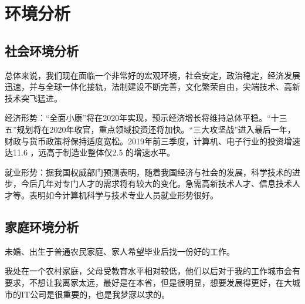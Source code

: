\documentclass{article}
\begin{document}
\section{环境分析}
\par
\subsection{社会环境分析}
\par
总体来说，我们现在面临一个非常好的宏观环境，社会安定，政治稳定，经济发展迅速，并与全球一体化接轨，法制建设不断完善，文化繁荣自由，尖端技术、高新技术突飞猛进。\par
经济形势：“全面小康”将在2020年实现，预示经济增长将维持总体平稳。“十三五”规划将在2020年收官，重点领域投资还将加快。“三大攻坚战”进入最后一年，财政与货币政策将保持适度宽松。2019年前三季度，计算机、电子行业的投资增速达11.6%
，远高于制造业整体仅2.5%
的增速水平。
\par
就业形势：据我国权威部门预测表明，随着我国经济与社会的发展，科学技术的进步，今后几年对专门人才的需求将有较大的变化。急需高新技术人才、信息技术人才等。表明如今计算机科学与技术专业人员就业形势很好。\par

\subsection{家庭环境分析}
\par
未婚、出生于普通农民家庭、家人希望毕业后找一份好的工作。\par
我处在一个农村家庭，父母受教育水平相对较低，他们以后对于我的工作城市会有要求，不想让我离家太远，最好是在本省，但是很明显，想要发展得更好，在大城市的IT公司是很重要的，也是我梦寐以求的。\par
\end{document}
